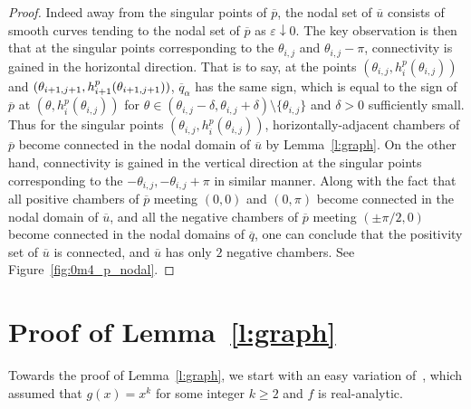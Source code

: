 \documentclass[AHL,Unicode,longabstracts,published]{cedram}
\newcommand{\da}{\downarrow}
\newcommand{\ol}{\overline}
\renewcommand{\epsilon}{\varepsilon}
\begin{document}
\begin{proof}
Indeed away from the singular points of $\ol{p}$, the nodal set of $\ol{u}$ consists of smooth curves tending to the nodal set of $\ol{p}$ as $\epsilon \da 0$. The key observation is then that at the singular points corresponding to the $\theta_{i,j}$ and $\theta_{i,j} - \pi$, connectivity is gained in the horizontal direction. That is to say, at the points $(\theta_{i,j}, h_i^p(\theta_{i,j}))$ and $(\theta_{i+1, j+1},\linebreak h_{i+1}^p(\theta_{i+1, j+1}))$, $\ol{q}_\alpha$ has the same sign, which is equal to the sign of $\ol{p}$ at $(\theta, h_i^p(\theta_{i,j})) $ for $\theta \in (\theta_{i,j} - \delta, \theta_{i,j} + \delta) \setminus \{\theta_{i,j}\}$ and $\delta >0 $ sufficiently small. Thus for the singular points $(\theta_{i,j}, h_i^p(\theta_{i,j}))$, horizontally-adjacent chambers of $\ol{p}$ become connected in the nodal domain of $\ol{u}$ by Lemma~\ref{l:graph}. On the other hand, connectivity is gained in the vertical direction at the singular points corresponding to the $-\theta_{i,j}, -\theta_{i,j} + \pi$ in similar manner. Along with the fact that all positive chambers of $\ol{p}$ meeting $(0, 0)$ and $(0, \pi)$ become connected in the nodal domain of $\ol{u}$, and all the negative chambers of $\ol{p}$ meeting $(\pm \pi/2, 0)$ become connected in the nodal domains of $\ol{q}$, one can conclude that the positivity set of $\ol{u}$ is connected, and $\ol{u}$ has only $2$ negative chambers. See Figure~\ref{fig:0m4_p_nodal}.
\end{proof}

\section{Proof of Lemma~\ref{l:graph}} \label{s:appendix}

Towards the proof of Lemma~\ref{l:graph}, we start with an easy variation of~\cite[Lemma~3]{Lewy77}, which assumed that $g(x)=x^k$ for some integer $k\geq 2$ and $f$ is real-analytic.
\end{document}
